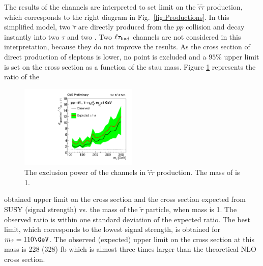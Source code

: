 The results of the \tauTau channels are interpreted to set limit on the $\tilde{\tau}\tilde{\tau}$ production, 
which corresponds to the right diagram in Fig.~\ref{fig:Productions}. 
In this simplified model, two $\tilde{\tau}$ are directly produced from the $pp$ collision and decay instantly 
into two $\tau$ and two \PSGczDo. Two $\ell\tau_{\rm had}$ channels are not considered in this interpretation, because they do not improve the results. 
As the cross section of direct production of sleptons is lower, no point is excluded and a $95\%$ upper limit is set on 
the cross section  as a function of the stau mass. 
Figure \ref{fig:limit_stau_stau} represents the ratio of the 
\begin{linenomath}
\begin{figure}[!htb]
\centering
\includegraphics[width=0.5\textwidth,keepaspectratio=true]{StatisticsFig/ExclusionSTauSTauLsp1.pdf}
\caption{The exclusion power of the \tauTau channels in $\tilde{\tau}\tilde{\tau}$ production. The mass of \PSGczDo is 1\GeV.}
\label{fig:limit_stau_stau}
\end{figure}
\end{linenomath}
obtained upper limit on the cross section and the cross section expected from SUSY (signal strength) vs. the mass of the $\tilde{\tau}$ particle, when \PSGczDo mass is 1\GeV.
The observed ratio is within one standard deviation of  the expected ratio.
The best limit, which corresponds to the lowest signal strength, is obtained for $m_{\tilde{\tau}}=110\GeV$. The observed (expected) upper limit on the cross section at this mass is 228 (328) fb which is almost three times larger than the theoretical NLO cross section.



